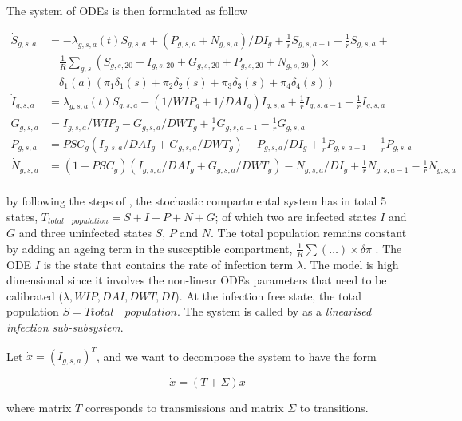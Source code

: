 \documentclass[12pt]{article}
\begin{document}
The system of ODEs is then formulated as follow

\begin{align*}
\dot{S}_{g,s,a} & =  -\lambda_{g,s,a}(t)S_{g,s,a} + (P_{g,s,a} + N_{g,s,a})/DI_g + \frac{1}{r}S_{g,s,a-1} - \frac{1}{r}S_{g,s,a} + \\
& \quad \frac{1}{R}\sum_{g,s}(S_{g,s,20} + I_{g,s,20} + G_{g,s,20} + P_{g,s,20} + N_{g,s,20}) \times \\
& \quad \delta_1(a)(\pi_1\delta_1(s) + \pi_2\delta_2(s) + \pi_3\delta_3(s) + \pi_4\delta_4(s)) \\ 
\dot{I}_{g,s,a}  & =  \lambda_{g,s,a}(t)S_{g,s,a} - (1/WIP_g + 1/DAI_g)I_{g,s,a} + \frac{1}{r}I_{g,s,a-1}-\frac{1}{r}I_{g,s,a} \\
\dot{G}_{g,s,a}  & =  I_{g,s,a}/WIP_g - G_{g,s,a}/DWT_g + \frac{1}{r}G_{g,s,a-1} - \frac{1}{r}G_{g,s,a} \\ 
\dot{P}_{g,s,a}  & =  PSC_g(I_{g,s,a}/DAI_g + G_{g,s,a}/DWT_g) - P_{g,s,a}/DI_g + \frac{1}{r}P_{g,s,a-1} - \frac{1}{r}P_{g,s,a} \\
\dot{N}_{g,s,a}  & =  (1-PSC_g)(I_{g,s,a}/DAI_g + G_{g,s,a}/DWT_g) - N_{g,s,a}/DI_g + \frac{1}{r}N_{g,s,a-1}-\frac{1}{r}N_{g,s,a} \\
\end{align*}

by following the steps of \cite[p.875]{Diekmann:2010}, the stochastic compartmental system has in total 5 states, $T_{total \quad population} = S + I + P + N + G$; of which two are infected states $I$ and $G$ and three uninfected states $S$, $P$ and $N$. The total population remains constant by adding an ageing term in the susceptible compartment, $\frac{1}{R}\sum(\dots)\times\delta\pi$ \cite[p.7]{Gareth:2013}. The ODE $I$ is the state that contains the rate of infection term $\lambda$. The model is high dimensional since it involves the non-linear ODEs parameters that need to be calibrated ($\lambda, WIP, DAI, DWT, DI$). At the infection free state, the total population $S=T{total \quad population}$. The system is called by \cite{Diekmann:2010} as a \textit{linearised infection sub-subsystem}. 

Let $\dot{x} = (I_{g,s,a})^{T}$, and we want to decompose the system to  have the form

\begin{equation}
\dot{x} = (T + \Sigma)x
\end{equation} 

where matrix $T$ corresponds to transmissions and matrix $\Sigma$ to transitions. 
\end{document}
